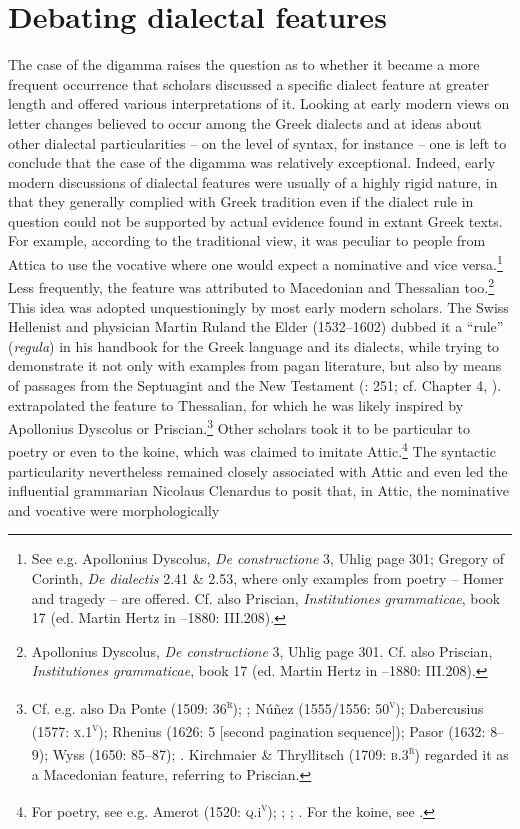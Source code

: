 \section{Debating dialectal features}

The case of the digamma raises the question as to whether it became a more frequent occurrence that scholars discussed a specific dialect feature at greater length and offered various interpretations of it. Looking at early modern views on letter changes believed to occur among the Greek dialects and at ideas about other dialectal particularities – on the level of syntax, for instance – one is left to conclude that the case of the digamma was relatively exceptional. Indeed, early modern discussions of dialectal features were usually of a highly rigid nature, in that they generally complied with Greek tradition even if the dialect rule in question could not be supported by actual evidence found in extant Greek texts. For example, according to the traditional view, it was peculiar to people from Attica to use the vocative where one would expect a nominative and vice versa.\footnote{See e.g. Apollonius Dyscolus, \textit{De constructione} 3, Uhlig page 301; Gregory of Corinth, \textit{De dialectis} 2.41 \& 2.53, where only examples from poetry – Homer and tragedy – are offered. Cf. also Priscian, \textit{Institutiones grammaticae}, book 17 (ed. Martin Hertz in \citealt{Keil1855}–1880: III.208).} Less frequently, the feature was attributed to Macedonian and Thessalian too.\footnote{Apollonius Dyscolus, \textit{De constructione} 3, Uhlig page 301. Cf. also Priscian, \textit{Institutiones grammaticae}, book 17 (ed. Martin Hertz in \citealt{Keil1855}–1880: III.208).} This idea was adopted unquestioningly by most early modern scholars. The Swiss Hellenist and physician Martin Ruland the Elder (1532–1602) dubbed it a “rule” (\textit{regula}) in his handbook for the Greek language and its dialects, while trying to demonstrate it not only with examples from pagan literature, but also by means of passages from the Septuagint and the New Testament (\citealt{Ruland1556}: 251; cf. Chapter 4, ). \citet[302]{Ruland1556} extrapolated the feature to Thessalian, for which he was likely inspired by Apollonius Dyscolus or Priscian.\footnote{Cf. e.g. also Da Ponte (1509: 36\textsc{\textsuperscript{r}}); \citet[216]{Vergara1537}; Núñez (1555/1556: 50\textsc{\textsuperscript{v}}); Dabercusius (1577: \textsc{x.1}\textsc{\textsuperscript{v}}); Rhenius (1626: 5 [second pagination sequence]); Pasor (1632: 8–9); Wyss (1650: 85–87); \citet[88]{Leusden1670}. Kirchmaier \& Thryllitsch (1709: \textsc{b.3}\textsc{\textsuperscript{r}}) regarded it as a Macedonian feature, referring to Priscian.} Other scholars took it to be particular to poetry or even to the koine, which was claimed to imitate Attic.\footnote{For poetry, see e.g. Amerot (1520: \textsc{q.}i\textsc{\textsuperscript{v}}); \citet[129]{Antesignanus1554}; \citet[34]{Gretser1593}; \citet[157]{Schmidt1604}. For the koine, see \citet[54]{Lancelot1655}.} The syntactic particularity nevertheless remained closely associated with Attic and even led the influential grammarian Nicolaus Clenardus to posit that, in Attic, the nominative and vocative were morphologically 